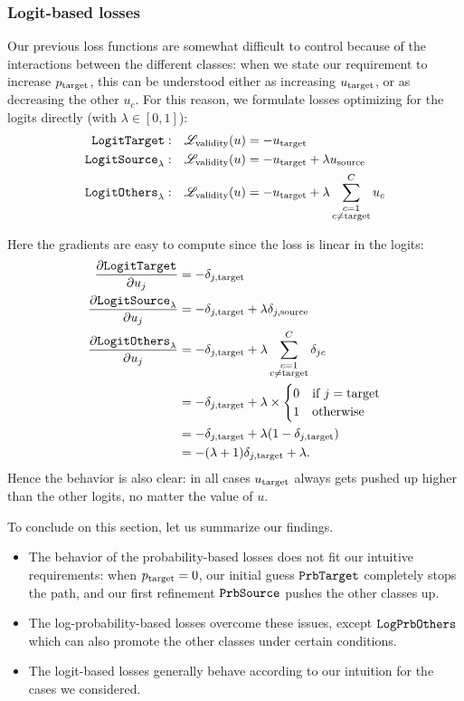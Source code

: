 \documentclass[../main.tex]{subfiles}
\begin{document}
\subsubsection{Logit-based losses}

Our previous loss functions are somewhat difficult to control because of the interactions between the different classes:
when we state our requirement to increase $p_{\mathrm{target}}$, this can be understood either as increasing $u_{\mathrm{target}}$, or as decreasing the other $u_c$.
For this reason, we formulate losses optimizing for the logits directly (with $\lambda \in [0, 1]$):
\begin{align*}
    \mathtt{LogitTarget}{}:        & \quad    \mathscr{L}_\text{validity}(u) = - u_{\mathrm{target}}                         \\
    \mathtt{LogitSource}_{\lambda}: & \quad     \mathscr{L}_\text{validity}(u) = - u_{\mathrm{target}} + \lambda u_{\mathrm{source}}    \\
    \mathtt{LogitOthers}_{\lambda}: & \quad    \mathscr{L}_\text{validity}(u) = - u_{\mathrm{target}} + \lambda \sum_{\substack{{c}=1 \\ {c} \neq \mathrm{target}}}^C u_c
\end{align*}

Here the gradients are easy to compute since the loss is linear in the logits:
\begin{align*}
\frac{\partial \mathtt{LogitTarget}{}}{\partial u_j} &= - \delta_{j, \mathrm{target}}                         \\
\frac{\partial \mathtt{LogitSource}_{\lambda}}{\partial u_j} &= - \delta_{j, \mathrm{target}} + \lambda \delta_{j, \mathrm{source}}                        \\
\frac{\partial \mathtt{LogitOthers}_{\lambda}}{\partial u_j}
&= - \delta_{j, \mathrm{target}} + \lambda \sum_{\substack{{c}=1 \\ {c} \neq \mathrm{target}}}^C \delta_{jc} \\
&= - \delta_{j, \mathrm{target}} + \lambda \times \begin{cases}
    0 & \text{if } j = \mathrm{target} \\
    1 & \text{otherwise} 
\end{cases} \\
&= - \delta_{j, \mathrm{target}} + \lambda (1 - \delta_{j, \mathrm{target}}) \\
&= -(\lambda + 1)\delta_{j, \mathrm{target}} + \lambda.
\end{align*}
Hence the behavior is also clear: in all cases $u_{\mathrm{target}}$ always gets pushed up higher than the other logits, no matter the value of $u$.

To conclude on this section, let us summarize our findings.
\begin{itemize}
    \item The behavior of the probability-based losses does not fit our intuitive requirements:
    when $p_{\mathrm{target}} = 0$, our initial guess $\mathtt{PrbTarget}$ completely stops the path, and our first
    refinement $\mathtt{PrbSource}_{}$ pushes the other classes up.
    \item The log-probability-based losses overcome these issues, except $\mathtt{LogPrbOthers}_{}$ which can also
    promote the other classes under certain conditions.
    \item The logit-based losses generally behave according to our intuition for the cases we considered.
\end{itemize}
\end{document}
